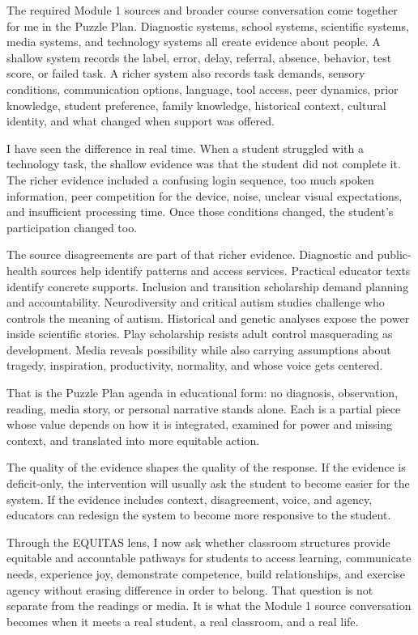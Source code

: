 
The required Module 1 sources and broader course conversation come together for me in the Puzzle Plan. Diagnostic systems, school systems, scientific systems, media systems, and technology systems all create evidence about people. A shallow system records the label, error, delay, referral, absence, behavior, test score, or failed task. A richer system also records task demands, sensory conditions, communication options, language, tool access, peer dynamics, prior knowledge, student preference, family knowledge, historical context, cultural identity, and what changed when support was offered.

I have seen the difference in real time. When a student struggled with a technology task, the shallow evidence was that the student did not complete it. The richer evidence included a confusing login sequence, too much spoken information, peer competition for the device, noise, unclear visual expectations, and insufficient processing time. Once those conditions changed, the student's participation changed too.

The source disagreements are part of that richer evidence. Diagnostic and public-health sources help identify patterns and access services. Practical educator texts identify concrete supports. Inclusion and transition scholarship demand planning and accountability. Neurodiversity and critical autism studies challenge who controls the meaning of autism. Historical and genetic analyses expose the power inside scientific stories. Play scholarship resists adult control masquerading as development. Media reveals possibility while also carrying assumptions about tragedy, inspiration, productivity, normality, and whose voice gets centered.

That is the Puzzle Plan agenda in educational form: no diagnosis, observation, reading, media story, or personal narrative stands alone. Each is a partial piece whose value depends on how it is integrated, examined for power and missing context, and translated into more equitable action.

The quality of the evidence shapes the quality of the response. If the evidence is deficit-only, the intervention will usually ask the student to become easier for the system. If the evidence includes context, disagreement, voice, and agency, educators can redesign the system to become more responsive to the student.

Through the EQUITAS lens, I now ask whether classroom structures provide equitable and accountable pathways for students to access learning, communicate needs, experience joy, demonstrate competence, build relationships, and exercise agency without erasing difference in order to belong. That question is not separate from the readings or media. It is what the Module 1 source conversation becomes when it meets a real student, a real classroom, and a real life.

